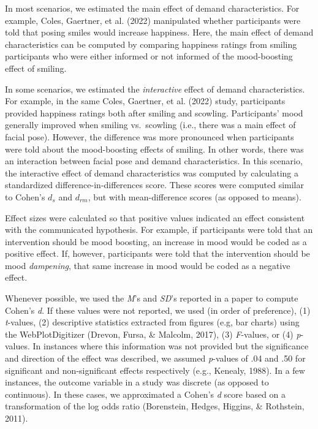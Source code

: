 \documentclass[
  man,floatsintext]{apa6}
\begin{document}
In most scenarios, we estimated the main effect of demand characteristics. For example, Coles, Gaertner, et al. (2022) manipulated whether participants were told that posing smiles would increase happiness. Here, the main effect of demand characteristics can be computed by comparing happiness ratings from smiling participants who were either informed or not informed of the mood-boosting effect of smiling.

In some scenarios, we estimated the \emph{interactive} effect of demand characteristics. For example, in the same Coles, Gaertner, et al. (2022) study, participants provided happiness ratings both after smiling and scowling. Participants' mood generally improved when smiling vs.~scowling (i.e., there was a main effect of facial pose). However, the difference was more pronounced when participants were told about the mood-boosting effects of smiling. In other words, there was an interaction between facial pose and demand characteristics. In this scenario, the interactive effect of demand characteristics was computed by calculating a standardized difference-in-differences score. These scores were computed similar to Cohen's \(d_{s}\) and \(d_{rm}\), but with mean-difference scores (as opposed to means).

Effect sizes were calculated so that positive values indicated an effect consistent with the communicated hypothesis. For example, if participants were told that an intervention should be mood boosting, an increase in mood would be coded as a positive effect. If, however, participants were told that the intervention should be mood \emph{dampening}, that same increase in mood would be coded as a negative effect.

Whenever possible, we used the \emph{M}'s and \emph{SD}'s reported in a paper to compute Cohen's \emph{d}. If these values were not reported, we used (in order of preference), (1) \emph{t}-values, (2) descriptive statistics extracted from figures (e.g, bar charts) using the WebPlotDigitizer (Drevon, Fursa, \& Malcolm, 2017), (3) \emph{F}-values, or (4) \emph{p}-values. In instances where this information was not provided but the significance and direction of the effect was described, we assumed \emph{p}-values of .04 and .50 for significant and non-significant effects respectively (e.g., Kenealy, 1988). In a few instances, the outcome variable in a study was discrete (as opposed to continuous). In these cases, we approximated a Cohen's \emph{d} score based on a transformation of the log odds ratio (Borenstein, Hedges, Higgins, \& Rothstein, 2011).
\end{document}
